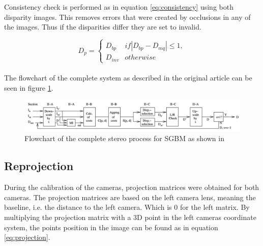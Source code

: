 Consistency check is performed as in equation \ref{eq:consistency} using both disparity images. This removes errors that were created by occlusions in any of the images. Thus if the disparities differ they are set to invalid. 


\begin{equation} \label{eq:consistency}
D_{p} =
\left\{\begin{matrix}
D_{bp}	&  if|D_{bp} - D_{mq}| \leq 1, \\
D_{inv} & otherwise
\end{matrix}\right.
\end{equation}\\ 


The flowchart of the complete system as described in the original article \cite{Hirschmuller2008} can be seen in figure \ref{fig:complete_system}.


\begin{figure}[h!]
  \centering
    \includegraphics[width=\textwidth]{graphics/06_vision/complete_system.jpg}
     \caption{ Flowchart of the complete stereo process for SGBM as shown in \cite{Hirschmuller2008} } 
    \label{fig:complete_system}
\end{figure}


\subsection{Reprojection} \label{sec:reprojection}

During the calibration of the cameras, projection matrices were obtained for both cameras. The projection matrices are based on the left camera lens, meaning the baseline, i.e. the distance to the left camera. Which  is 0 for the left matrix. By multiplying the projection matrix with a 3D point in the left cameras coordinate system, the points position in the image can be found as in equation \ref{eq:projection}. 



